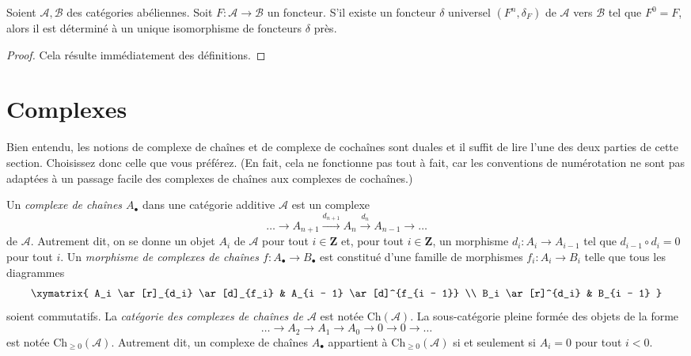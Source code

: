\begin{lemma}
\label{lemma-uniqueness-universal-delta-functor}
Soient $\mathcal{A}, \mathcal{B}$ des catégories abéliennes.
Soit $F : \mathcal{A} \to \mathcal{B}$ un foncteur.
S'il existe un foncteur $\delta$ universel
$(F^n, \delta_F)$ de $\mathcal{A}$ vers $\mathcal{B}$
tel que $F^0 = F$, alors il est déterminé à un unique isomorphisme
de foncteurs $\delta$ près.
\end{lemma}

\begin{proof}
Cela résulte immédiatement des définitions.
\end{proof}





\section{Complexes}
\label{section-complexes}

\noindent
Bien entendu, les notions de complexe de chaînes et de complexe de cochaînes
sont duales et il suffit de lire l'une des deux parties de
cette section. Choisissez donc celle que vous préférez. (En fait, cela ne
fonctionne pas tout à fait, car les conventions de numérotation
ne sont pas adaptées à un passage facile des complexes de chaînes aux complexes de
cochaînes.)

\medskip\noindent
Un {\it complexe de chaînes $A_\bullet$} dans une catégorie additive $\mathcal{A}$
est un complexe
$$
\ldots \to
A_{n + 1} \xrightarrow{d_{n + 1}}
A_n \xrightarrow{d_n}
A_{n - 1} \to
\ldots
$$
de $\mathcal{A}$. Autrement dit, on se donne un objet $A_i$ de
$\mathcal{A}$ pour tout $i \in \mathbf{Z}$ et, pour
tout $i \in \mathbf{Z}$, un morphisme $d_i : A_i \to A_{i - 1}$ tel que
$d_{i - 1} \circ d_i = 0$ pour tout $i$. Un {\it morphisme de complexes
de chaînes $f : A_\bullet \to B_\bullet$} est constitué d'une
famille de morphismes $f_i : A_i \to B_i$ telle que tous
les diagrammes
$$
\xymatrix{
A_i \ar[r]_{d_i} \ar[d]_{f_i} & A_{i - 1} \ar[d]^{f_{i - 1}} \\
B_i \ar[r]^{d_i} & B_{i - 1}
}
$$
soient commutatifs. La {\it catégorie des complexes de chaînes de $\mathcal{A}$}
est notée $\text{Ch}(\mathcal{A})$. La sous-catégorie pleine formée
des objets de la forme
$$
\ldots \to A_2 \to A_1 \to A_0 \to 0 \to 0 \to \ldots
$$
est notée $\text{Ch}_{\geq 0}(\mathcal{A})$.
Autrement dit, un complexe de chaînes $A_\bullet$ appartient à
$\text{Ch}_{\geq 0}(\mathcal{A})$ si et seulement si
$A_i = 0$ pour tout $i < 0$.

